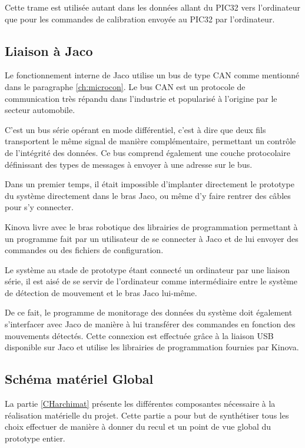 \documentclass[letterpaper, twoside, 12pt, memoire, creativecommons, hyperref]{thETS}
\begin{document}
Cette trame est utilisée autant dans les données allant du PIC32 vers l'ordinateur que pour les commandes de calibration envoyée au PIC32 par l'ordinateur.

\subsection{Liaison à Jaco}

Le fonctionnement interne de Jaco utilise un bus de type CAN comme mentionné dans le paragraphe \ref{ch:microcon}. Le bus CAN est un protocole de communication très répandu dans l'industrie et popularisé à l'origine par le secteur automobile. 

C'est un bus série opérant en mode différentiel, c'est à dire que deux fils transportent le même signal de manière complémentaire, permettant un contrôle de l'intégrité des données. Ce bus comprend également une couche protocolaire définissant des types de messages à envoyer à une adresse sur le bus. 

Dans un premier temps, il était impossible d'implanter directement le prototype du système directement dans le bras Jaco, ou même d'y faire rentrer des câbles pour s'y connecter. 

Kinova livre avec le bras robotique des librairies de programmation permettant à un programme fait par un utilisateur de se connecter à Jaco et de lui envoyer des commandes ou des fichiers de configuration. 

Le système au stade de prototype étant connecté un ordinateur par une liaison série, il est aisé de se servir de l'ordinateur comme intermédiaire entre le système de détection de mouvement et le bras Jaco lui-même.

De ce fait, le programme de monitorage des données du système doit également s'interfacer avec Jaco de manière à lui transférer des commandes en fonction des mouvements détectés. Cette connexion est effectuée grâce à la liaison USB disponible sur Jaco et utilise les librairies de programmation fournies par Kinova.

\subsection{Schéma matériel Global}

La partie \ref{CHarchimat} présente les différentes composantes nécessaire à la réalisation matérielle du projet. Cette partie a pour but de synthétiser tous les choix effectuer de manière à donner du recul et un point de vue global du prototype entier. 
\end{document}
